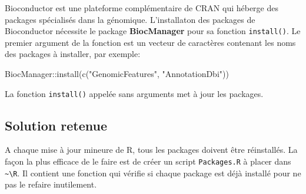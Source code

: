 \documentclass[
  11pt,
  french,
  a4paper,
  extrafontsizes,onecolumn,openright
  ]{memoir}
\newenvironment{Shaded}{\begin{snugshade}}{\end{snugshade}}
\newcommand{\FunctionTok}[1]{\textcolor[rgb]{0.00,0.00,0.00}{#1}}
\newcommand{\NormalTok}[1]{#1}
\newcommand{\SpecialCharTok}[1]{\textcolor[rgb]{0.00,0.00,0.00}{#1}}
\newcommand{\StringTok}[1]{\textcolor[rgb]{0.31,0.60,0.02}{#1}}
\begin{document}
Bioconductor est une plateforme complémentaire de CRAN qui héberge des packages spécialisés dans la génomique.
L'installaton des packages de Bioconductor nécessite le package \textbf{BiocManager} pour sa fonction \texttt{install()}.
Le premier argument de la fonction est un vecteur de caractères contenant les noms des packages à installer, par exemple:

\scriptsize

\begin{Shaded}
\begin{Highlighting}[]
\NormalTok{BiocManager}\SpecialCharTok{::}\FunctionTok{install}\NormalTok{(}\FunctionTok{c}\NormalTok{(}\StringTok{"GenomicFeatures"}\NormalTok{, }\StringTok{"AnnotationDbi"}\NormalTok{))}
\end{Highlighting}
\end{Shaded}

\normalsize

La fonction \texttt{install()} appelée sans arguments met à jour les packages.

\hypertarget{solution-retenue}{%
\subsection{Solution retenue}\label{solution-retenue}}

A chaque mise à jour mineure de R, tous les packages doivent être réinstallés.
La façon la plus efficace de le faire est de créer un script \texttt{Packages.R} à placer dans \texttt{\textasciitilde{}\textbackslash{}R}.
Il contient une fonction qui vérifie si chaque package est déjà installé pour ne pas le refaire inutilement.

\scriptsize
\end{document}

